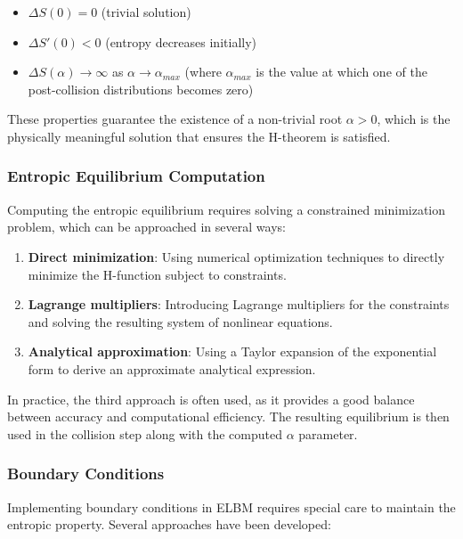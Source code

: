 \documentclass[12pt,a4paper]{article}
\begin{document}
\begin{itemize}
    \item $\Delta S(0) = 0$ (trivial solution)
    \item $\Delta S'(0) < 0$ (entropy decreases initially)
    \item $\Delta S(\alpha) \to \infty$ as $\alpha \to \alpha_{max}$ (where $\alpha_{max}$ is the value at which one of the post-collision distributions becomes zero)
\end{itemize}

These properties guarantee the existence of a non-trivial root $\alpha > 0$, which is the physically meaningful solution that ensures the H-theorem is satisfied.

\subsubsection{Entropic Equilibrium Computation}

Computing the entropic equilibrium requires solving a constrained minimization problem, which can be approached in several ways:

\begin{enumerate}
    \item \textbf{Direct minimization}: Using numerical optimization techniques to directly minimize the H-function subject to constraints.

    \item \textbf{Lagrange multipliers}: Introducing Lagrange multipliers for the constraints and solving the resulting system of nonlinear equations.

    \item \textbf{Analytical approximation}: Using a Taylor expansion of the exponential form to derive an approximate analytical expression.
\end{enumerate}

In practice, the third approach is often used, as it provides a good balance between accuracy and computational efficiency. The resulting equilibrium is then used in the collision step along with the computed $\alpha$ parameter.

\subsubsection{Boundary Conditions}

Implementing boundary conditions in ELBM requires special care to maintain the entropic property. Several approaches have been developed:
\end{document}
